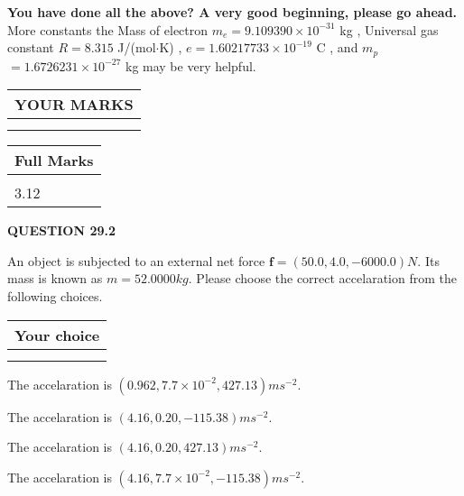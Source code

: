 \documentclass[12pt]{article}
\begin{document}
   
\vspace{0.3in}
{\textbf{\LARGE{You have done all the above? A very good beginning, please go ahead.}}}
More constants the
Mass of electron
$m_e$$ =
9.109390 \times 10^{-31} $
kg
,
Universal gas constant
$R$$ =
8.315 $
J/(mol$\cdot $K)
,
$e$$ =
1.60217733 \times 10^{-19} $
C
, and
$m_p$$ =
1.6726231 \times 10^{-27} $
kg
%
may be very helpful.
\vspace{0.3in}
   
   
  
\vspace{0.2in}
  
\noindent\begin{tabular}{|l|}
\hline
 YOUR MARKS  \\
\hline
 \\ 
 \\ 
\hline
\end{tabular}
\hspace{0.05in} \begin{tabular}{|l|}
\hline
 Full Marks  \\
\hline
 \\ 
3.12 \\
\hline
\end{tabular}
{\textbf{\Large{QUESTION
29.2 
}}}
  
  
 
 
An object is subjected to an external net force $\mathbf{f}=
(50.0 , 4.0 , -6000.0) N$.
Its mass is known as $m= %
52.0000 kg$. Please choose the
correct accelaration from the following choices.
 
  
  
\noindent\hspace{3.0in} \begin{tabular}{|l|}
\hline
Your choice \\
\hline
 \\ 
 \\ 
\hline
\end{tabular}
  
  
 
 
The accelaration is $  %
(
0.962,
7.7 \times 10^{-2},
427.13)
ms^{-2} $.
 
 
The accelaration is $  %
(
4.16,
0.20,
-115.38)
ms^{-2} $.
 
 
The accelaration is $  %
(
4.16,
0.20,
427.13)
ms^{-2} $.
 
 
The accelaration is $  %
(
4.16,
7.7 \times 10^{-2},
-115.38)
ms^{-2} $.
 
\end{document}
